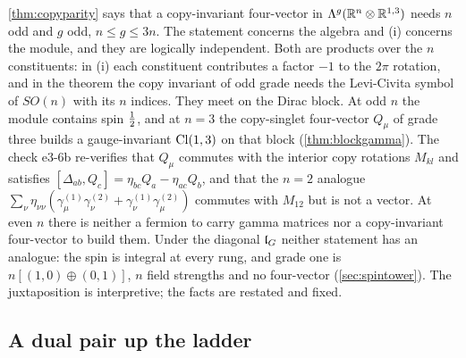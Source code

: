 \begin{remark}
\label{e3:rem:copyparity}
\cref{thm:copyparity} says that a copy-invariant four-vector in $\Lambda^g(\mathbb{R}^n\otimes\mathbb{R}^{1,3})$ needs $n$ odd and $g$ odd, $n\le g\le3n$. The
statement concerns the algebra and (i) concerns the module, and they are logically independent. Both are products over the $n$ constituents:
in (i) each constituent contributes a factor $-1$ to the $2\pi$ rotation, and in the theorem the copy invariant of odd grade needs the
Levi-Civita symbol of $SO(n)$ with its $n$ indices. They meet on the Dirac block. At odd $n$ the module contains spin $\tfrac12$, and at $n=3$ the
copy-singlet four-vector $Q_\mu$ of grade three builds a gauge-invariant $\mathrm{Cl}(1,3)$ on that block (\cref{thm:blockgamma}). The check e3-6b
re-verifies that $Q_\mu$ commutes with the interior copy rotations $M_{kl}$ and satisfies $[\Delta_{ab},Q_c]=\eta_{bc}Q_a-\eta_{ac}Q_b$, and that the $n=2$
analogue $\sum_\nu\eta_{\nu\nu}(\gamma^{(1)}_\mu\gamma^{(2)}_\nu+\gamma^{(1)}_\nu\gamma^{(2)}_\mu)$ commutes with $M_{12}$ but is not a vector. At even $n$ there is
neither a fermion to carry gamma matrices nor a copy-invariant four-vector to build them. Under the diagonal $\mathfrak l_G$ neither statement has
an analogue: the spin is integral at every rung, and grade one is $n[(1,0)\oplus(0,1)]$, $n$ field strengths and no four-vector (\cref{sec:spintower}). The juxtaposition is interpretive; the facts are restated and fixed.
\end{remark}

\subsection{A dual pair up the ladder}
\label{e3:sec:dual}

